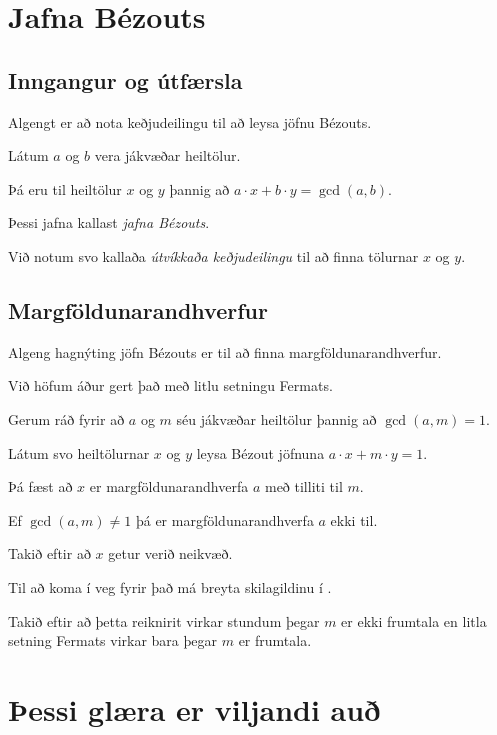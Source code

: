 \section{Jafna Bézouts}
\subsection{Inngangur og útfærsla}
{
    {
        \item<1-> Algengt er að nota keðjudeilingu til að leysa jöfnu Bézouts.
        \item<2-> Látum $a$ og $b$ vera jákvæðar heiltölur.
        \item<3-> Þá eru til heiltölur $x$ og $y$ þannig að $a \cdot x + b \cdot y = \gcd(a, b)$.
        \item<4-> Þessi jafna kallast \emph{jafna Bézouts}.
        \item<5-> Við notum svo kallaða \emph{útvíkkaða keðjudeilingu} til að finna tölurnar $x$ og $y$.
        \item<6->[] 
    }
}

\subsection{Margföldunarandhverfur}
{
    {
        \item<1-> Algeng hagnýting jöfn Bézouts er til að finna margföldunarandhverfur.
        \item<2-> Við höfum áður gert það með litlu setningu Fermats.
        \item<3-> Gerum ráð fyrir að $a$ og $m$ séu jákvæðar heiltölur þannig að $\gcd(a, m) = 1$.
        \item<4-> Látum svo heiltölurnar $x$ og $y$ leysa Bézout jöfnuna $a \cdot x + m \cdot y = 1$.
        \item<5-> Þá fæst að $x$ er margföldunarandhverfa $a$ með tilliti til $m$.
        \item<6-> Ef $\gcd(a, m) \neq 1$ þá er margföldunarandhverfa $a$ ekki til.
        \item<7->[] 
        \item<8-> Takið eftir að $x$ getur verið neikvæð.
        \item<9-> Til að koma í veg fyrir það má breyta skilagildinu í .
    }
}

{
    {
        \item<1-> Takið eftir að þetta reiknirit virkar stundum þegar $m$ er ekki frumtala en litla setning Fermats virkar bara þegar $m$ er frumtala.
    }
}

\section{Þessi glæra er viljandi auð}
{
}


